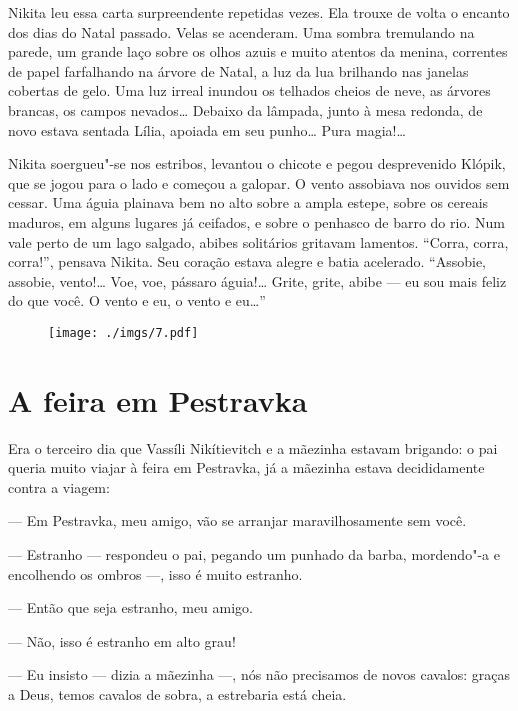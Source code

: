 Nikita leu essa carta surpreendente repetidas vezes. Ela trouxe de volta
o encanto dos dias do Natal passado. Velas se acenderam. Uma sombra
tremulando na parede, um grande laço sobre os olhos azuis e
muito atentos da menina, correntes de papel farfalhando na árvore
de Natal, a luz da lua brilhando nas janelas cobertas de gelo. Uma luz
irreal inundou os telhados cheios de neve, as árvores brancas, os campos
nevados\ldots{} Debaixo da lâmpada, junto à mesa redonda, de novo estava
sentada Lília, apoiada em seu punho\ldots{} Pura magia!\ldots{}

Nikita soergueu"-se nos estribos, levantou o chicote e pegou desprevenido
Klópik, que se jogou para o lado e começou a galopar. O vento assobiava
nos ouvidos sem cessar. Uma águia plainava bem no alto sobre a ampla
estepe, sobre os cereais maduros, em alguns lugares já ceifados, e sobre
o penhasco de barro do rio. Num vale perto de um lago salgado, abibes
solitários gritavam lamentos. ``Corra, corra, corra!'', pensava Nikita.
Seu coração estava alegre e batia acelerado. ``Assobie, assobie,
vento!\ldots{} Voe, voe, pássaro águia!\ldots{} Grite, grite, abibe --- eu sou
mais feliz do que você. O vento e eu, o vento e eu\ldots{}''

\begin{figure}
\vspace*{-2.1cm}
\hspace*{-2.5cm}\texttt{[image: ./imgs/7.pdf]}
\end{figure}

\chapter{A feira em Pestravka}

Era o terceiro dia que Vassíli Nikítievitch e a mãezinha estavam
brigando: o pai queria muito viajar à feira em Pestravka, já a mãezinha
estava decididamente contra a viagem:

--- Em Pestravka, meu amigo, vão se arranjar maravilhosamente sem você.

--- Estranho --- respondeu o pai, pegando um punhado da barba,
mordendo"-a e encolhendo os ombros ---, isso é muito estranho.

--- Então que seja estranho, meu amigo.

--- Não, isso é estranho em alto grau!

--- Eu insisto --- dizia a mãezinha ---, nós não precisamos de novos
cavalos: graças a Deus, temos cavalos de sobra, a estrebaria está cheia.

